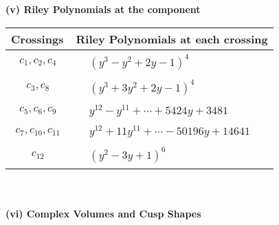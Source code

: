\documentclass[1p]{elsarticle_modified}
\theoremstyle{definition}
\begin{document}
\newpage\renewcommand{\arraystretch}{1}
\flushleft \textbf{(v) Riley Polynomials at the component}\newline \\
\begin{tabular}{m{50pt}|m{274pt}}
Crossings & \hspace{64pt}Riley Polynomials at each crossing \\
\hline $$\begin{aligned}c_{1},c_{2},c_{4}\end{aligned}$$&$\begin{aligned}
&(y^3- y^2+2 y-1)^4
\end{aligned}$\\
\hline $$\begin{aligned}c_{3},c_{8}\end{aligned}$$&$\begin{aligned}
&(y^3+3 y^2+2 y-1)^4
\end{aligned}$\\
\hline $$\begin{aligned}c_{5},c_{6},c_{9}\end{aligned}$$&$\begin{aligned}
&y^{12}- y^{11}+\cdots+5424 y+3481
\end{aligned}$\\
\hline $$\begin{aligned}c_{7},c_{10},c_{11}\end{aligned}$$&$\begin{aligned}
&y^{12}+11 y^{11}+\cdots-50196 y+14641
\end{aligned}$\\
\hline $$\begin{aligned}c_{12}\end{aligned}$$&$\begin{aligned}
&(y^2-3 y+1)^6
\end{aligned}$\\
\hline
\end{tabular}\\~\\
\newpage\flushleft \textbf{(vi) Complex Volumes and Cusp Shapes}
\end{document}
